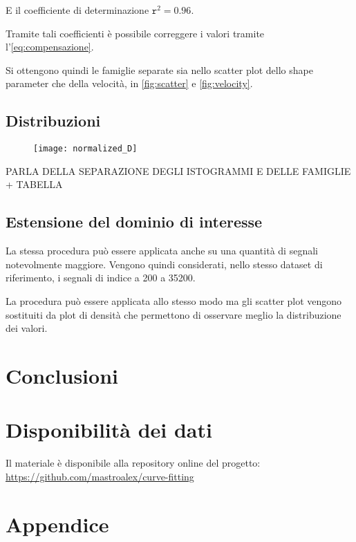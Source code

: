 E il coefficiente di determinazione $\mathtt{r}^2=0.96$. 

Tramite tali coefficienti è possibile correggere i valori tramite l'\cref{eq:compensazione}.

Si ottengono quindi le famiglie separate sia nello scatter plot dello shape parameter che della velocità, in \cref{fig:scatter} e \cref{fig:velocity}.


\textcolor{blue}{\lipsum[1-2]}

\subsection{Distribuzioni}

\begin{figure}[b!]
	\centering
	\texttt{[image: normalized\_D]}
	\caption{}
	\label{fig:normalizedDensity}
\end{figure}



PARLA DELLA SEPARAZIONE DEGLI ISTOGRAMMI E DELLE FAMIGLIE + TABELLA



\subsection{Estensione del dominio di interesse}




La stessa procedura può essere applicata anche su una quantità di segnali notevolmente maggiore. Vengono quindi considerati, nello stesso dataset di riferimento, i segnali di indice a 200 a 35200. 

La procedura può essere applicata allo stesso modo ma gli scatter plot vengono sostituiti da plot di densità che permettono di osservare meglio la distribuzione dei valori.


\section{Conclusioni}
\textcolor{blue}{\lipsum[1]}

\pagebreak
\section*{Disponibilità dei dati}

Il materiale è disponibile alla repository online del progetto: \url{https://github.com/mastroalex/curve-fitting}


\raggedbottom
\printbibliography[title=Riferimenti]


\clearpage
\onecolumn
\section*{Appendice}




